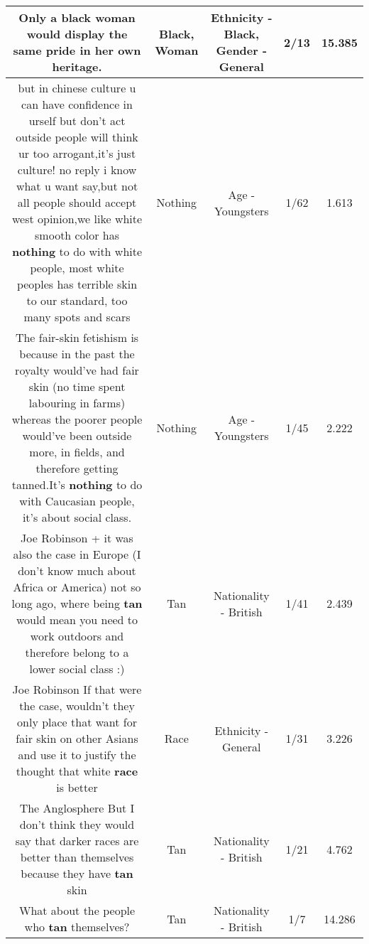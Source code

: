 \documentclass[11pt]{article}
\newlength\mylength
\begin{document}
\begin{center}
\begin{longtable}{|C{.65\mylength}|C{.30\mylength}|C{.12\mylength}|C{.12\mylength}|C{.12\mylength}|}
  \small Only a \textbf{black} \textbf{woman} would display the same pride in her own heritage.\normalsize   & Black, Woman & Ethnicity - Black, Gender - General & 2/13 & 15.385 \\  \hline
  \small but in chinese culture u can have confidence in urself but don't act outside people will think ur too arrogant,it's just culture! no reply i know what u want say,but not all people should accept west opinion,we like white smooth color has \textbf{nothing} to do with white people, most white peoples has terrible skin to our standard, too many spots and scars\normalsize   & Nothing & Age - Youngsters & 1/62 & 1.613 \\  \hline
  \small The fair-skin fetishism is because in the past the royalty would've had fair skin (no time spent labouring in farms) whereas the poorer people would've been outside more, in fields, and therefore getting tanned.It's \textbf{nothing} to do with Caucasian people, it's about social class.\normalsize   & Nothing & Age - Youngsters & 1/45 & 2.222 \\  \hline
  \small Joe Robinson + it was also the case in Europe (I don't know much about Africa or America) not so long ago, where being \textbf{tan} would mean you need to work outdoors and therefore belong to a lower social class :)\normalsize   & Tan & Nationality - British & 1/41 & 2.439 \\  \hline
  \small Joe Robinson If that were the case, wouldn't they only place that want for fair skin on other Asians and use it to justify the thought that white \textbf{race} is better\normalsize   & Race & Ethnicity - General & 1/31 & 3.226 \\  \hline
  \small The Anglosphere But I don't think they would say that darker races are better than themselves because they have \textbf{tan} skin\normalsize   & Tan & Nationality - British & 1/21 & 4.762 \\  \hline
  \small What about the people who \textbf{tan} themselves?\normalsize   & Tan & Nationality - British & 1/7 & 14.286 \\  \hline

\end{longtable}
\end{center}
\end{document}
